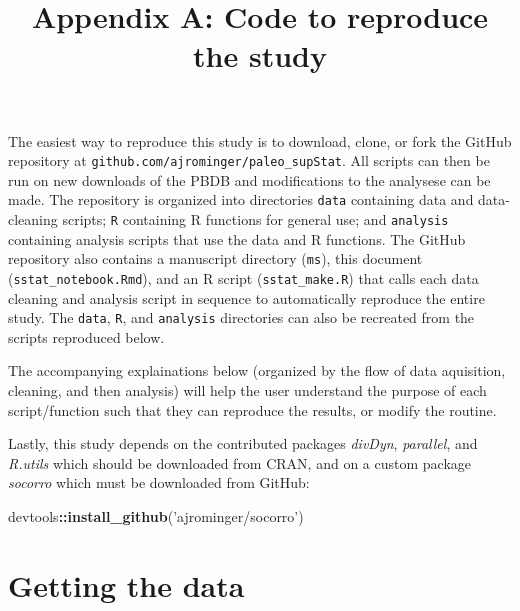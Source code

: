\documentclass[]{article}
\title{Appendix A: Code to reproduce the study}
\author{}
\date{}
\newenvironment{Shaded}{\begin{snugshade}}{\end{snugshade}}
\newcommand{\KeywordTok}[1]{\textcolor[rgb]{0.13,0.29,0.53}{\textbf{#1}}}
\newcommand{\StringTok}[1]{\textcolor[rgb]{0.31,0.60,0.02}{#1}}
\newcommand{\OperatorTok}[1]{\textcolor[rgb]{0.81,0.36,0.00}{\textbf{#1}}}
\newcommand{\NormalTok}[1]{#1}
\begin{document}
\maketitle

\newcommand{\beginappendix}{%
  \setcounter{table}{0}
  \renewcommand{\thetable}{A\arabic{table}}%
  \setcounter{figure}{0}
  \renewcommand{\thefigure}{A\arabic{figure}}%
  \setcounter{section}{0}
  \renewcommand{\thesection}{A\arabic{section}}%
}

\beginappendix

The easiest way to reproduce this study is to download, clone, or fork
the GitHub repository at \texttt{github.com/ajrominger/paleo\_supStat}.
All scripts can then be run on new downloads of the PBDB and
modifications to the analysese can be made. The repository is organized
into directories \texttt{data} containing data and data-cleaning
scripts; \texttt{R} containing R functions for general use; and
\texttt{analysis} containing analysis scripts that use the data and R
functions. The GitHub repository also contains a manuscript directory
(\texttt{ms}), this document (\texttt{sstat\_notebook.Rmd}), and an R
script (\texttt{sstat\_make.R}) that calls each data cleaning and
analysis script in sequence to automatically reproduce the entire study.
The \texttt{data}, \texttt{R}, and \texttt{analysis} directories can
also be recreated from the scripts reproduced below.

The accompanying explainations below (organized by the flow of data
aquisition, cleaning, and then analysis) will help the user understand
the purpose of each script/function such that they can reproduce the
results, or modify the routine.

Lastly, this study depends on the contributed packages \emph{divDyn},
\emph{parallel}, and \emph{R.utils} which should be downloaded from
CRAN, and on a custom package \emph{socorro} which must be downloaded
from GitHub:

\begin{Shaded}
\begin{Highlighting}[]
\NormalTok{devtools}\OperatorTok{::}\KeywordTok{install_github}\NormalTok{(}\StringTok{'ajrominger/socorro'}\NormalTok{)}
\end{Highlighting}
\end{Shaded}

\section{Getting the data}\label{getting-the-data}
\end{document}
